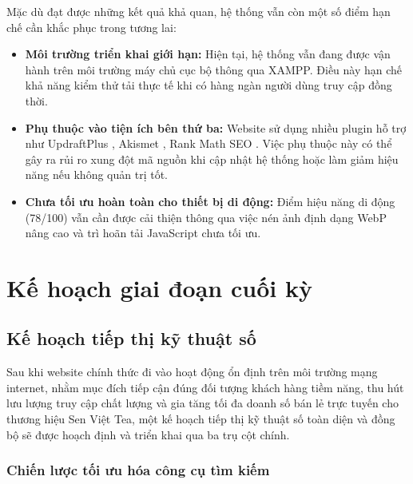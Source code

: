 Mặc dù đạt được những kết quả khả quan, hệ thống vẫn còn một số điểm hạn chế cần khắc phục trong tương lai:
\begin{itemize}
    \item \textbf{Môi trường triển khai giới hạn:} Hiện tại, hệ thống vẫn đang được vận hành trên môi trường máy chủ cục bộ thông qua XAMPP. Điều này hạn chế khả năng kiểm thử tải thực tế khi có hàng ngàn người dùng truy cập đồng thời.
    \item \textbf{Phụ thuộc vào tiện ích bên thứ ba:} Website sử dụng nhiều plugin hỗ trợ như UpdraftPlus \cite{plugin_updraftplus}, Akismet \cite{plugin_akismet}, Rank Math SEO \cite{plugin_rankmath}. Việc phụ thuộc này có thể gây ra rủi ro xung đột mã nguồn khi cập nhật hệ thống hoặc làm giảm hiệu năng nếu không quản trị tốt.
    \item \textbf{Chưa tối ưu hoàn toàn cho thiết bị di động:} Điểm hiệu năng di động (78/100) vẫn cần được cải thiện thông qua việc nén ảnh định dạng WebP nâng cao và trì hoãn tải JavaScript chưa tối ưu.
\end{itemize}

\section{Kế hoạch giai đoạn cuối kỳ}

\subsection{Kế hoạch tiếp thị kỹ thuật số}

Sau khi website chính thức đi vào hoạt động ổn định trên môi trường mạng internet, nhằm mục đích tiếp cận đúng đối tượng khách hàng tiềm năng, thu hút lưu lượng truy cập chất lượng và gia tăng tối đa doanh số bán lẻ trực tuyến cho thương hiệu Sen Việt Tea, một kế hoạch tiếp thị kỹ thuật số toàn diện và đồng bộ sẽ được hoạch định và triển khai qua ba trụ cột chính.

\subsubsection{Chiến lược tối ưu hóa công cụ tìm kiếm}

